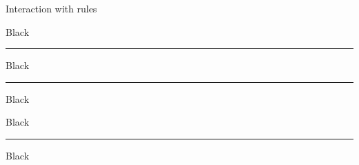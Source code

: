 \documentclass[10pt]{article}
\begin{document}
Interaction with rules

Black

{\color{blue}
\hrule height 2pt width 100pt
}

Black

{\color{blue}
\rule{100pt}{2pt}
}

Black

\color{black}

Black

{\indent\color{blue}
\rule{100pt}{2pt}
}

Black
\end{document}

